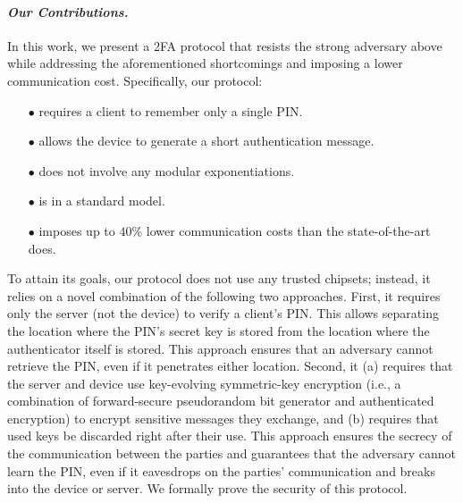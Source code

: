 \vspace{-4mm}
\paragraph{\textbf{\textit{Our Contributions.}}}  In this work, we present a 2FA protocol that resists the strong adversary above while addressing the aforementioned shortcomings and imposing a lower communication cost. Specifically, our protocol:

\vspace{-2mm}
\begin{itemize}
\item[$\bullet$] requires a client to remember only a single PIN.

\item[$\bullet$] {allows the device to generate a short authentication message.} 

\item[$\bullet$] does not involve any modular exponentiations.

\item[$\bullet$] is in a standard model.

\item[$\bullet$]  imposes up to $40\%$ lower communication costs than the state-of-the-art does. 


\end{itemize}

\vspace{-2mm}

 To attain its goals, our protocol does not use any trusted chipsets; instead, it relies on a novel combination of the following two approaches. First, it requires only the server  (not the device) to verify a client’s PIN. This allows separating the location where the PIN’s secret key is stored from the location where the authenticator itself is stored. This approach ensures that an adversary cannot retrieve the PIN, even if it penetrates either location.  Second, it  (a) requires that the server and device use key-evolving symmetric-key encryption (i.e., a combination of forward-secure pseudorandom bit generator and authenticated encryption) to encrypt sensitive messages they exchange,  and (b) requires that used keys be discarded right after their use. This approach ensures the secrecy of the communication between the parties and guarantees that the adversary cannot learn the PIN, even if it eavesdrops on the parties' communication and breaks into the device or server. We formally prove the security of this protocol. 


